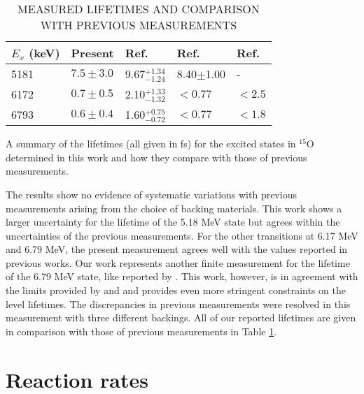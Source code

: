 \begin{table}[]
\caption{MEASURED LIFETIMES AND COMPARISON WITH PREVIOUS MEASUREMENTS}
\begin{center}
\begin{threeparttable}
\begin{tabular}{lllll}
\toprule
$E_{x}$ (keV) & Present       & Ref. \cite{Bertone2001}  & Ref. \cite{Schurmann2008} & Ref. \cite{Galinski2014} \\
\midrule
5181          & $7.5 \pm 3.0$ & 9.67$^{+1.34}_{-1.24}$ & 8.40$\pm$1.00            & -                       \\
6172          & $0.7 \pm 0.5$ & 2.10$^{+1.33}_{-1.32}$  & $< 0.77$                 & $< 2.5$                 \\
6793          & $0.6 \pm 0.4$ & 1.60$^{+0.75}_{-0.72}$  & $< 0.77$                 & $< 1.8$    \\ \bottomrule
\end{tabular}
\begin{tablenotes}
\small 
\item A summary of the lifetimes (all given in fs) for the excited states in $^{15}$O determined in this work and how they compare with those of previous measurements. 
\end{tablenotes}
\end{threeparttable}
\label{table: lifetimesConclusion}
\end{center}
\end{table}

The results show no evidence of systematic variations with previous measurements arising from the choice of backing materials. This work shows a larger uncertainty for the lifetime of the 5.18 MeV state but agrees within the uncertainties of the previous measurements. For the other transitions at 6.17 MeV and 6.79 MeV, the present measurement agrees well with the values reported in previous works. Our work represents another finite measurement for the lifetime of the 6.79 MeV state, like reported by \citet{Bertone2001}. This work, however, is in agreement with the limits provided by \citet{Schurmann2008} and \citet{Galinski2014} and provides even more stringent constraints on the level lifetimes. The discrepancies in previous measurements were resolved in this measurement with three different backings. All of our reported lifetimes are given in comparison with those of previous measurements in Table \ref{table: lifetimesConclusion}.


\section{Reaction rates}
\label{sec: rates}



